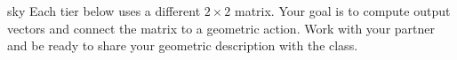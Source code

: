 \documentclass[10pt]{article}
\begin{document}
\namepartnerperiod

\vspace{0.1in}

\begin{scenariobox}{sky}
\small
Each tier below uses a different $2\times 2$ matrix.  Your goal is to compute output
vectors and connect the matrix to a geometric action.  Work with your partner and be
ready to share your geometric description with the class.
\end{scenariobox}

\vspace{0.1in}

\end{document}

